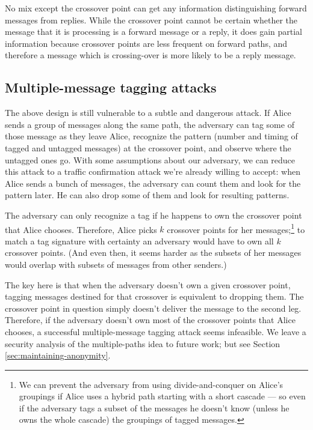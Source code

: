 \documentclass[11pt]{IEEEtran}
\begin{document}
No mix except the crossover point can get any information distinguishing
forward messages from replies. While the crossover point cannot be
certain whether the message that it is processing is a forward message
or a reply, it does gain partial information because crossover points
are less frequent on forward paths, and therefore a message which is
crossing-over is more likely to be a reply message.

\subsection{Multiple-message tagging attacks}
\label{subsec:multi-tagging}

The above design is still vulnerable to a subtle and dangerous
attack. If Alice sends a group of messages along the same path, the
adversary can tag some of those message as they leave Alice, recognize
the pattern (number and timing of tagged and untagged messages) at the
crossover point, and observe where the untagged ones go.
With some assumptions about our adversary, we can reduce
this attack to a traffic confirmation attack we're already willing to
accept: when Alice sends a bunch of messages, the adversary can count
them and look for the pattern later. He can also drop some of them and
look for resulting patterns.

The adversary can only recognize a tag if he happens to own the crossover
point that Alice chooses.
Therefore, Alice picks $k$ crossover points for her
messages;\footnote{
  We can prevent the adversary from using divide-and-conquer on Alice's
  groupings if Alice uses a hybrid path starting with a short cascade ---
  so even if the adversary tags a subset of the messages he doesn't know
  (unless he owns the whole cascade) the groupings of tagged messages.
}
to match a tag signature with certainty an adversary would
have to own all $k$ crossover points.  (And even then, it seems harder
as the subsets of her messages would overlap with subsets of
messages from other senders.)


The key here is that when the adversary doesn't own a given crossover
point, tagging messages destined for that crossover is equivalent to
dropping them.  The crossover point in question simply doesn't deliver
the message to the second leg. Therefore, if the adversary doesn't own
most of the crossover points that Alice chooses, a successful
multiple-message tagging attack seems infeasible.  We leave a security
analysis of the multiple-paths idea to future work; but see
Section \ref{sec:maintaining-anonymity}.
\end{document}
